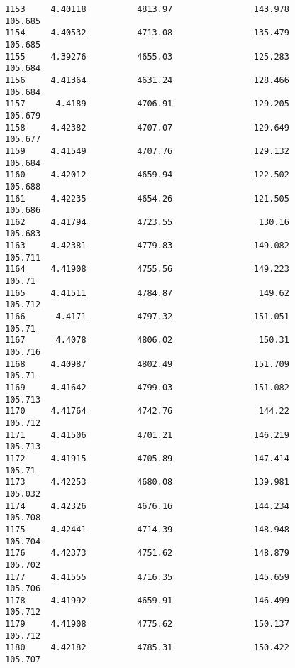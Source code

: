 \documentclass[11pt]{article}
\begin{document}
\begin{tcolorbox}[breakable, size=fbox, boxrule=.5pt, pad at break*=1mm, opacityfill=0]
\begin{Verbatim}[commandchars=\\\{\}]
1153     4.40118          4813.97                143.978            105.685
1154     4.40532          4713.08                135.479            105.685
1155     4.39276          4655.03                125.283            105.684
1156     4.41364          4631.24                128.466            105.684
1157      4.4189          4706.91                129.205            105.679
1158     4.42382          4707.07                129.649            105.677
1159     4.41549          4707.76                129.132            105.684
1160     4.42012          4659.94                122.502            105.688
1161     4.42235          4654.26                121.505            105.686
1162     4.41794          4723.55                 130.16            105.683
1163     4.42381          4779.83                149.082            105.711
1164     4.41908          4755.56                149.223             105.71
1165     4.41511          4784.87                 149.62            105.712
1166      4.4171          4797.32                151.051             105.71
1167      4.4078          4806.02                 150.31            105.716
1168     4.40987          4802.49                151.709             105.71
1169     4.41642          4799.03                151.082            105.713
1170     4.41764          4742.76                 144.22            105.712
1171     4.41506          4701.21                146.219            105.713
1172     4.41915          4705.89                147.414             105.71
1173     4.42253          4680.08                139.981            105.032
1174     4.42326          4676.16                144.234            105.708
1175     4.42441          4714.39                148.948            105.704
1176     4.42373          4751.62                148.879            105.702
1177     4.41555          4716.35                145.659            105.706
1178     4.41992          4659.91                146.499            105.712
1179     4.41908          4775.62                150.137            105.712
1180     4.42182          4785.31                150.422            105.707


\end{Verbatim}
\end{tcolorbox}
\end{document}
